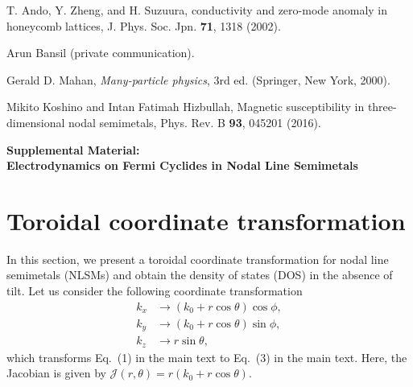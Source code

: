 \documentclass[aps,twocolumn,floatfix]{revtex4-1}
\begin{document}
\begin{thebibliography}{999}
T. Ando, Y. Zheng, and H. Suzuura,
conductivity and zero-mode anomaly in honeycomb lattices,
J. Phys. Soc. Jpn. {\bf 71}, 1318 (2002).

Arun Bansil (private communication).

Gerald D. Mahan, \textit{Many-particle physics}, 3rd ed. (Springer, New York, 2000).

Mikito Koshino and Intan Fatimah Hizbullah,
Magnetic susceptibility in three-dimensional nodal semimetals,
Phys. Rev. B {\bf 93}, 045201 (2016).

\end{thebibliography}


\clearpage %
\widetext
\setcounter{section}{0}
\setcounter{equation}{0}
\setcounter{figure}{0} %
\setcounter{table}{0} %
\renewcommand\thefigure{S\arabic{figure}} %
\setcounter{page}{1}

\large
\begin{center}
{\bf Supplemental Material:\\
Electrodynamics on Fermi Cyclides in Nodal Line Semimetals}
\end{center}
\normalsize

\section{Toroidal coordinate transformation}
\label{sec:transformation}
In this section, we present a toroidal coordinate transformation for nodal line semimetals (NLSMs) and obtain the density of states (DOS) in the absence of tilt. Let us consider the following coordinate transformation
\begin{equation}\label{eq:transformation}
\begin{split}
k_x&\rightarrow (k_0+r\cos\theta) \cos\phi,\\
k_y&\rightarrow (k_0+r\cos\theta) \sin\phi,\\
k_z&\rightarrow r\sin\theta,
\end{split}
\end{equation}
which transforms Eq.~(1) in the main text to Eq.~(3) in the main text. Here, the Jacobian is given by $\mathcal{J}(r,\theta)=r(k_0+r\cos{\theta})$.
\end{document}
